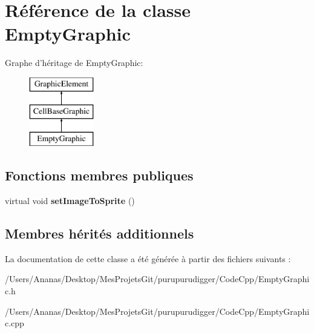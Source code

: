 \hypertarget{class_empty_graphic}{\section{Référence de la classe Empty\-Graphic}
\label{class_empty_graphic}
}
Graphe d'héritage de Empty\-Graphic\-:\begin{figure}[H]
\begin{center}
\leavevmode
\includegraphics[height=3.000000cm]{class_empty_graphic}
\end{center}
\end{figure}
\subsection*{Fonctions membres publiques}
\begin{DoxyCompactItemize}
\item 
\hypertarget{class_empty_graphic_a39a2b103f1e102d21f6e3d464d09ee29}{virtual void {\bfseries set\-Image\-To\-Sprite} ()}\label{class_empty_graphic_a39a2b103f1e102d21f6e3d464d09ee29}

\end{DoxyCompactItemize}
\subsection*{Membres hérités additionnels}


La documentation de cette classe a été générée à partir des fichiers suivants \-:\begin{DoxyCompactItemize}
\item 
/\-Users/\-Ananas/\-Desktop/\-Mes\-Projets\-Git/purupurudigger/\-Code\-Cpp/Empty\-Graphic.\-h\item 
/\-Users/\-Ananas/\-Desktop/\-Mes\-Projets\-Git/purupurudigger/\-Code\-Cpp/Empty\-Graphic.\-cpp\end{DoxyCompactItemize}
